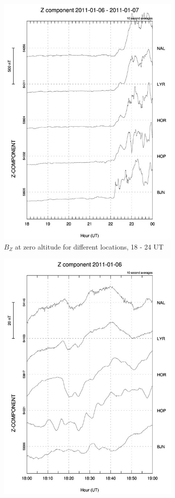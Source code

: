 \documentclass[10pt,a4paper]{article}
\begin{document}
\begin{figure}[h]
	\begin{subfigure}[h]{.5\textwidth}
		\centering
		\includegraphics[width=.8\linewidth]{Z_gram.jpg}
		\caption{$B_Z$ at zero altitude for different locations, 18 - 24 UT}
		\label{mag1}
	\end{subfigure}
	\begin{subfigure}[h]{.5\textwidth}
		\centering
		\includegraphics[width=.8\linewidth]{Z_gram1.jpg}

\end{subfigure}
\end{figure}
\end{document}
